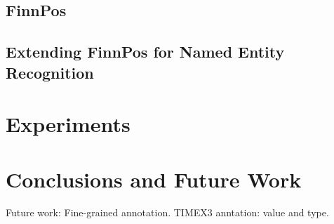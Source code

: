 \documentclass[11pt]{article}
\begin{document}
\subsection{FinnPos}



\subsection{Extending FinnPos for Named Entity Recognition}




\section{Experiments}
\label{sec: experiments}




\section{Conclusions and Future Work}
\label{sec: conclusions}


Future work: Fine-grained annotation. TIMEX3 anntation: value and type.



\newpage

%

\end{document}
